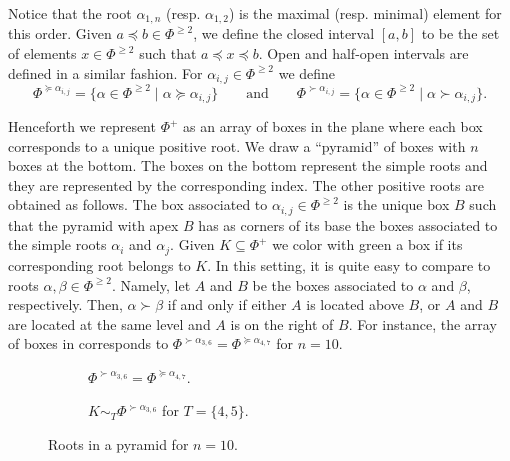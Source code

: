 Notice that the root $\alpha_{1,n}$ (resp. $\alpha_{1,2}$) is the maximal (resp. minimal) element for this order.
Given $a\preceq b\in \Phi^{\geq 2}$, we define the  closed interval $[a,b]$ to be  the set of elements $x \in \Phi^{\geq 2}$ such that $a\preceq x \preceq b$. 
Open and half-open intervals are defined in a similar fashion.
For $\alpha_{i,j}\in \Phi^{\geq 2}$ we define
\begin{equation}
    \Phi^{\succeq \alpha_{i,j}} =\{ \alpha \in \Phi^{\geq 2} \mid \alpha \succeq \alpha_{i,j}  \} \qquad \mbox{and} \qquad
     \Phi^{\succ \alpha_{i,j}} =\{ \alpha \in \Phi^{\geq 2} \mid \alpha \succ \alpha_{i,j}  \}.
\end{equation}



Henceforth we represent  $\Phi^+$ as an array of boxes in the plane where each box corresponds to a unique positive root.
We draw a ``pyramid'' of boxes with $n$ boxes at the bottom. 
The boxes on the bottom represent the simple roots and they are represented by the corresponding index. 
The other positive roots are obtained as follows. 
The box associated to $\alpha_{i,j}\in \Phi^{\geq 2}$ is the unique box $B$ such that the pyramid with apex $B$ has as corners of its base the boxes associated to the simple roots $\alpha_i$ and $\alpha_j$. 
Given $K\subseteq \Phi^+$ we color with green a box if its corresponding root belongs to $K$. 
In this setting, it is quite easy to compare to roots $\alpha, \beta \in \Phi^{\geq 2}$.
Namely, let $A$ and $B$ be the boxes associated to $\alpha$ and $\beta$, respectively.
Then, $\alpha \succ \beta$ if and only if either $A$ is located above $B$, or $A$ and $B$ are located at the same level and $A$ is on the right of $B$.
For instance, the array of boxes in   corresponds to $\Phi^{\succ \alpha_{3,6}}=\Phi^{\succeq \alpha_{4,7}}$ for $n=10$. 


\begin{figure}[H]
     \centering
     \begin{subfigure}[b]{0.45\textwidth}
         \centering
        {\scalebox{.4}{\exbonito}}
    \caption{ $\Phi^{\succ \alpha_{3,6}}=\Phi^{\succeq \alpha_{4,7}}$.  }
    \label{fig: rootsA}
     \end{subfigure}
     \hfill
     \begin{subfigure}[b]{0.45\textwidth}
         \centering
        {\scalebox{.4}{\exbonitoB}}
    \caption{$ K \sim_T \Phi^{\succ \alpha_{3,6}} $ for $T=\{4,5\}$.}
    \label{fig: rootsB}
     \end{subfigure}
        \caption{Roots in a pyramid for $n=10$.}
        \label{fig: ejemplos de roots}
\end{figure}




